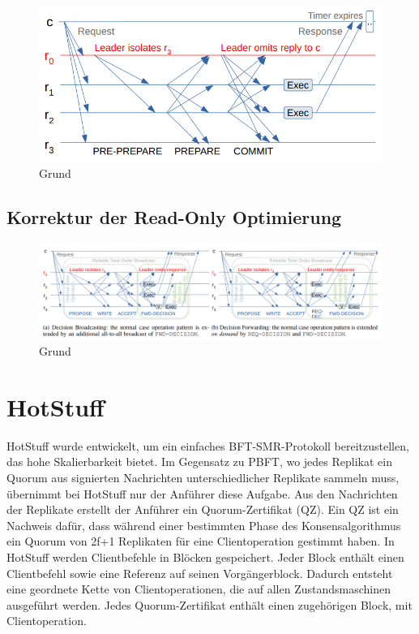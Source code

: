 \documentclass[nonacm,sigconf,natbib=false]{acmart}
\begin{document}
\begin{figure}[htbp]
  \centering
  \includegraphics[width=\linewidth]{read-only-problem.png}
  \caption{Grund}
  \label{fig:read-only-problem}
\end{figure}

\subsection{Korrektur der Read-Only Optimierung}



\begin{figure}[htbp]
  \centering
  \includegraphics[width=\linewidth]{read-only-korrektur.png}
  \caption{Grund}
  \label{fig:read-only-korrektur}
\end{figure}


\section{HotStuff}

HotStuff\cite{hotstuff} wurde entwickelt, um ein einfaches BFT-SMR-Protokoll bereitzustellen, das hohe Skalierbarkeit bietet. Im Gegensatz zu PBFT, wo jedes Replikat ein Quorum aus signierten Nachrichten unterschiedlicher Replikate sammeln muss, übernimmt bei HotStuff nur der Anführer diese Aufgabe. Aus den Nachrichten der Replikate erstellt der Anführer ein Quorum-Zertifikat (QZ). Ein QZ ist ein Nachweis dafür, dass während einer bestimmten Phase des Konsensalgorithmus ein Quorum von 2f+1 Replikaten für eine Clientoperation gestimmt haben. In HotStuff werden Clientbefehle in Blöcken gespeichert. Jeder Block enthält einen Clientbefehl sowie eine Referenz auf seinen Vorgängerblock. Dadurch entsteht eine geordnete Kette von Clientoperationen, die auf allen Zustandsmaschinen ausgeführt werden. Jedes Quorum-Zertifikat enthält einen zugehörigen Block, mit Clientoperation.
\end{document}
